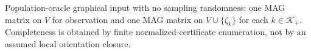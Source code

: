 Population-oracle graphical input with no sampling randomness: one MAG matrix on \(V\) for observation and one MAG matrix on \(V\cup\{\zeta_k\}\) for each \(k\in\mathcal K_+\).  Completeness is obtained by finite normalized-certificate enumeration, not by an assumed local orientation closure.